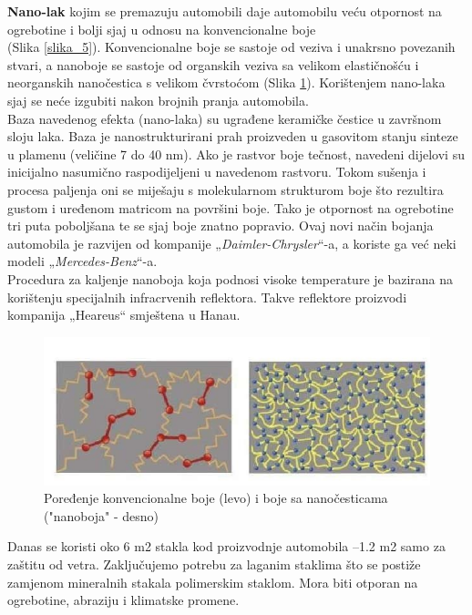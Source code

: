 \documentclass[a4paper]{article}
\begin{document}
{\textbf{Nano-lak} kojim se premazuju automobili daje automobilu veću otpornost na ogrebotine i bolji sjaj u odnosu na konvencionalne boje \\ (Slika \ref{slika_5}). Konvencionalne boje se sastoje od veziva i unakrsno povezanih stvari, a nanoboje se sastoje od organskih veziva sa velikom elastičnošću i neorganskih nanočestica s velikom čvrstoćom (Slika \ref{slika_6}). Korištenjem nano-laka sjaj se neće izgubiti nakon brojnih pranja automobila.\\

Baza navedenog efekta (nano-laka) su ugrađene keramičke čestice u završnom sloju laka. Baza je nanostrukturirani prah proizveden u gasovitom stanju sinteze u plamenu (veličine 7 do 40 nm). 
Ako je rastvor boje tečnost, navedeni dijelovi su inicijalno nasumično raspodijeljeni u navedenom rastvoru. Tokom sušenja i procesa paljenja oni se miješaju s molekularnom strukturom boje što rezultira gustom i uređenom matricom na površini boje. Tako je otpornost na ogrebotine tri puta poboljšana te se sjaj boje znatno popravio. Ovaj novi način bojanja automobila je razvijen od kompanije „\textit{Daimler-Chrysler}“-a, a koriste ga već neki modeli „\textit{Mercedes-Benz}“-a. \\

Procedura za kaljenje nanoboja koja podnosi visoke temperature je bazirana na korištenju specijalnih infracrvenih reflektora. Takve reflektore proizvodi kompanija „Heareus“ smještena u Hanau.

\begin{figure}[H]
    \centering
    \includegraphics[width=.7\textwidth]{slika 6.jpg}
    \caption{Poređenje konvencionalne boje (levo) i boje sa nanočesticama ("nanoboja" - desno)}
    \label{slika_6}
\end{figure}

Danas se koristi oko 6 m2 stakla kod proizvodnje automobila –1.2 m2 samo za zaštitu od vetra. Zaključujemo potrebu za laganim staklima što se postiže zamjenom mineralnih stakala polimerskim staklom. Mora biti otporan na ogrebotine, abraziju i klimatske promene. \\

}
\end{document}
